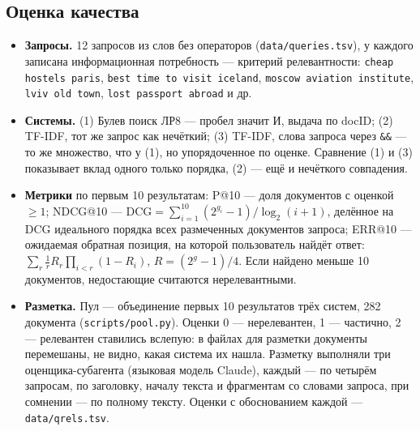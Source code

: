 \subsection{Оценка качества}
\begin{itemize}
    \item \textbf{Запросы.} 12 запросов из слов без операторов (\texttt{data/queries.tsv}), у каждого записана информационная потребность --- критерий релевантности: \texttt{cheap hostels paris}, \texttt{best time to visit iceland}, \texttt{moscow aviation institute}, \texttt{lviv old town}, \texttt{lost passport abroad} и др.
    \item \textbf{Системы.} (1) Булев поиск ЛР8 --- пробел значит И, выдача по docID; (2) TF-IDF, тот же запрос как нечёткий; (3) TF-IDF, слова запроса через \texttt{\&\&} --- то же множество, что у (1), но упорядоченное по оценке. Сравнение (1) и (3) показывает вклад одного только порядка, (2) --- ещё и нечёткого совпадения.
    \item \textbf{Метрики} по первым 10 результатам: P@10 --- доля документов с оценкой $\ge 1$; NDCG@10 --- $\mathrm{DCG} = \sum_{i=1}^{10} (2^{g_i} - 1) / \log_2(i + 1)$, делённое на DCG идеального порядка всех размеченных документов запроса; ERR@10 --- ожидаемая обратная позиция, на которой пользователь найдёт ответ: $\sum_r \frac{1}{r} R_r \prod_{i<r} (1 - R_i)$, $R = (2^g - 1) / 4$. Если найдено меньше 10 документов, недостающие считаются нерелевантными.
    \item \textbf{Разметка.} Пул --- объединение первых 10 результатов трёх систем, 282 документа (\texttt{scripts/pool.py}). Оценки 0 --- нерелевантен, 1 --- частично, 2 --- релевантен ставились вслепую: в файлах для разметки документы перемешаны, не видно, какая система их нашла. Разметку выполняли три оценщика-субагента (языковая модель Claude), каждый --- по четырём запросам, по заголовку, началу текста и фрагментам со словами запроса, при сомнении --- по полному тексту. Оценки с обоснованием каждой --- \texttt{data/qrels.tsv}.
\end{itemize}
